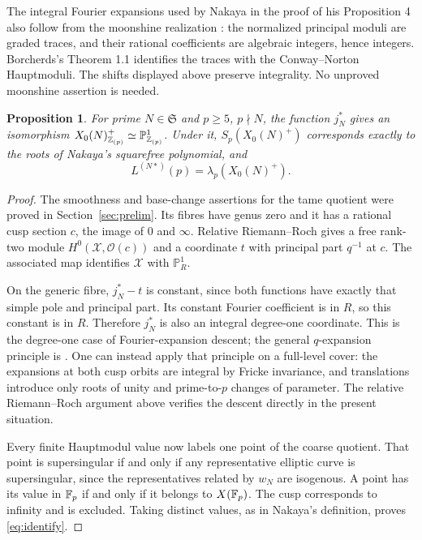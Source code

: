 \documentclass[11pt,a4paper]{article}
\newtheorem{proposition}[theorem]{Proposition}
\theoremstyle{remark}\newtheorem{remark}[theorem]{Remark}
\numberwithin{equation}{section}
\begin{document}
The integral Fourier expansions used by Nakaya in the proof of his Proposition 4 also follow from the moonshine realization \cite{CN,Borcherds}: the normalized principal moduli are graded traces, and their rational coefficients are algebraic integers, hence integers. Borcherds's Theorem 1.1 identifies the traces with the Conway--Norton Hauptmoduli. The shifts displayed above preserve integrality. No unproved moonshine assertion is needed.

\begin{proposition}\label{prop:coordinate}
For prime $N\in\mathfrak S$ and $p\geq5$, $p\nmid N$, the function $j_N^*$ gives an isomorphism $X_0(N)^+_{\mathbb Z_{(p)}}\simeq\mathbb P^1_{\mathbb Z_{(p)}}$. Under it, $S_p(X_0(N)^+)$ corresponds exactly to the roots of Nakaya's squarefree polynomial, and
\begin{equation}\label{eq:identify}
L^{(N*)}(p)=\lambda_p(X_0(N)^+).
\end{equation}
\end{proposition}
\begin{proof}
The smoothness and base-change assertions for the tame quotient were proved in Section~\ref{sec:prelim}. Its fibres have genus zero and it has a rational cusp section $c$, the image of $0$ and $\infty$. Relative Riemann--Roch gives a free rank-two module $H^0(\mathscr X,\mathcal O(c))$ and a coordinate $t$ with principal part $q^{-1}$ at $c$. The associated map identifies $\mathscr X$ with $\mathbb P^1_R$.

On the generic fibre, $j_N^*-t$ is constant, since both functions have exactly that simple pole and principal part. Its constant Fourier coefficient is in $R$, so this constant is in $R$. Therefore $j_N^*$ is also an integral degree-one coordinate. This is the degree-one case of Fourier-expansion descent; the general $q$-expansion principle is \cite[VII, Theorem 3.9]{DR}. One can instead apply that principle on a full-level cover: the expansions at both cusp orbits are integral by Fricke invariance, and translations introduce only roots of unity and prime-to-$p$ changes of parameter. The relative Riemann--Roch argument above verifies the descent directly in the present situation.

Every finite Hauptmodul value now labels one point of the coarse quotient. That point is supersingular if and only if any representative elliptic curve is supersingular, since the representatives related by $w_N$ are isogenous. A point has its value in $\mathbb F_p$ if and only if it belongs to $X(\mathbb F_p)$. The cusp corresponds to infinity and is excluded. Taking distinct values, as in Nakaya's definition, proves \eqref{eq:identify}.
\end{proof}
\end{document}
